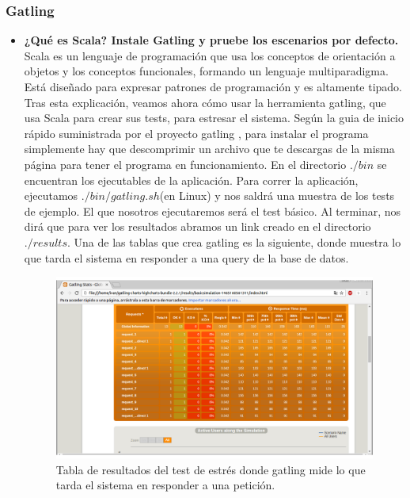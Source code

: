 \subsubsection{Gatling}
\begin{itemize}
	\item \textbf{¿Qué es Scala? Instale Gatling y pruebe los escenarios por defecto.}\\
	Scala \cite{scala} es un lenguaje de programación que usa los conceptos de orientación a objetos y los conceptos funcionales, formando un lenguaje multiparadigma. Está diseñado para expresar patrones de programación y es altamente tipado.\\
	
	Tras esta explicación, veamos ahora cómo usar la herramienta gatling, que usa Scala para crear sus tests, para estresar el sistema. Según la guia de inicio rápido suministrada por el proyecto gatling \cite{gatling}, para instalar el programa simplemente hay que descomprimir un archivo que te descargas de la misma página para tener el programa en funcionamiento. En el directorio $./bin$ se encuentran los ejecutables de la aplicación. Para correr la aplicación, ejecutamos $./bin/gatling.sh$(en Linux) y nos saldrá una muestra de los tests de ejemplo. El que nosotros ejecutaremos será el test básico. Al terminar, nos dirá que para ver los resultados abramos un link creado en el directorio $./results$. Una de las tablas que crea gatling es la siguiente, donde muestra lo que tarda el sistema en responder a una query de la base de datos.\\
	\begin{figure}[H]
		\centering
		\includegraphics[width=0.7\linewidth]{Gatling_results1}
		\caption[Table resultados]{Tabla de resultados del test de estrés donde gatling mide lo que tarda el sistema en responder a una petición.}
		\label{fig:Gatling_results1}
	\end{figure}
	

\end{itemize}
